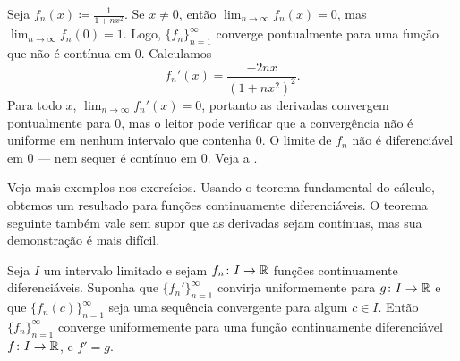 \begin{example} \label{exercise:badconvergenceder}
Seja $f_n(x) \coloneqq \frac{1}{1+nx^2}$.
Se $x \neq 0$, então $\lim_{n \to \infty} f_n(x) = 0$,
mas $\lim_{n \to \infty} f_n(0) = 1$.
Logo, $\{ f_n \}_{n=1}^\infty$ converge pontualmente para uma função que
não é contínua em 0.
Calculamos
\begin{equation*}
f_n'(x) %
= \frac{-2 n x}{(1+ n x^2)^2} .
\end{equation*}
Para todo $x$, $\lim_{n\to\infty} f_n'(x) = 0$, portanto as derivadas
convergem pontualmente para 0, mas o leitor pode verificar que a
convergência não é uniforme em nenhum intervalo que contenha 0.
O limite de $f_n$ não é diferenciável em 0 — nem sequer é contínuo em 0.
Veja a .
\begin{myfigureht}
\caption{Gráficos de $\frac{1}{1+nx^2}$ e de sua derivada para
$n=1,2,\ldots,10$, com os valores maiores de $n$ em tons mais claros de cinza.%
\label{fig:convder1over1pnxsq}}
\end{myfigureht}
\end{example}

Veja mais exemplos nos exercícios. Usando o teorema fundamental do cálculo,
obtemos um resultado para funções continuamente diferenciáveis. O teorema
seguinte também vale sem supor que as derivadas sejam contínuas, mas sua
demonstração é mais difícil.

\begin{thm} \label{thm:dersconverge}
Seja $I$ um intervalo limitado e sejam $f_n \colon I \to {\mathbb{R}}$ funções
continuamente diferenciáveis.
Suponha que $\{ f_n' \}_{n=1}^\infty$ convirja uniformemente para
$g \colon I \to {\mathbb{R}}$ e que $\bigl\{ f_n(c) \bigr\}_{n=1}^\infty$ seja
uma sequência convergente para algum $c \in I$. Então
$\{ f_n \}_{n=1}^\infty$ converge uniformemente para uma função
continuamente diferenciável $f \colon I \to {\mathbb{R}}$, e $f' = g$.
\end{thm}

